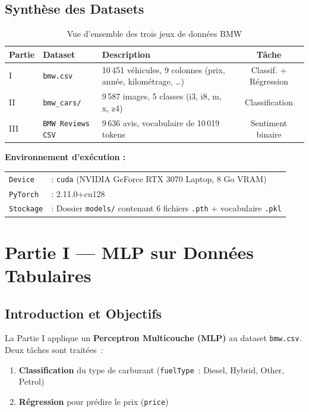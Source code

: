 \documentclass[12pt,a4paper]{report}
\begin{document}
\section*{Synthèse des Datasets}

\begin{table}[H]
\centering
\caption{Vue d'ensemble des trois jeux de données BMW}
\begin{tabularx}{\textwidth}{@{}lXXc@{}}
\toprule
\textbf{Partie} & \textbf{Dataset} & \textbf{Description} & \textbf{Tâche} \\
\midrule
I   & \texttt{bmw.csv}               & 10\,451 véhicules, 9 colonnes (prix, année, kilométrage, \ldots) & Classif. + Régression \\
II  & \texttt{bmw\_cars/}            & 9\,587 images, 5 classes (i3, i8, m, x, z4) & Classification \\
III & \texttt{BMW Reviews CSV}       & 9\,636 avis, vocabulaire de 10\,019 tokens & Sentiment binaire \\
\bottomrule
\end{tabularx}
\end{table}

\vspace{0.2cm}
\begin{infobox}
\centering
\textbf{Environnement d'exécution :}
\begin{tabular}{ll}
\texttt{Device}   & : \texttt{cuda} (NVIDIA GeForce RTX 3070 Laptop, 8 Go VRAM) \\
\texttt{PyTorch}  & : 2.11.0+cu128 \\
\texttt{Stockage} & : Dossier \texttt{models/} contenant 6 fichiers \texttt{.pth} + vocabulaire \texttt{.pkl}
\end{tabular}
\end{infobox}

\chapter{Partie I --- MLP sur Données Tabulaires}

\section{Introduction et Objectifs}

La Partie I applique un \textbf{Perceptron Multicouche (MLP)} au
dataset \texttt{bmw.csv}. Deux tâches sont traitées~:
\begin{enumerate}[leftmargin=*,nosep]
  \item \textbf{Classification} du type de carburant (\texttt{fuelType}~: Diesel, Hybrid, Other, Petrol)
  \item \textbf{Régression} pour prédire le prix (\texttt{price})
\end{enumerate}
\end{document}
